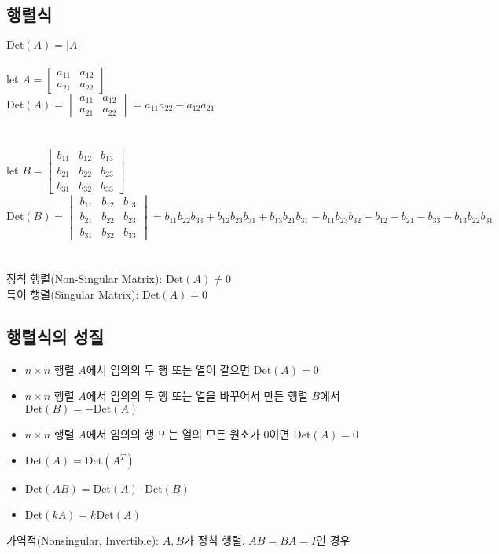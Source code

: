\subsection{행렬식}
$\mathrm{Det}(A) = |A|$\\\\
let $A = \begin{bmatrix}
    a_{11} & a_{12}\\
    a_{21} & a_{22}
\end{bmatrix}$\\
$\mathrm{Det}(A) = \begin{vmatrix}
    a_{11} & a_{12}\\
    a_{21} & a_{22}
\end{vmatrix} = a_{11}a_{22}-a_{12}a_{21}$\\\\\\
let $B = \begin{bmatrix}
    b_{11}&b_{12}&b_{13}\\
    b_{21}&b_{22}&b_{23}\\
    b_{31}&b_{32}&b_{33}
\end{bmatrix}$\\
$\mathrm{Det}(B) = \begin{vmatrix}
    b_{11}&b_{12}&b_{13}\\
    b_{21}&b_{22}&b_{23}\\
    b_{31}&b_{32}&b_{33}
\end{vmatrix} = b_{11}b_{22}b_{33}+b_{12}b_{23}b_{31}+b_{13}b_{21}b_{31}-b_{11}b_{23}b_{32}-b_{12}-b_{21}-b_{33}-b_{13}b_{22}b_{31}$\\\\\\
정칙 행렬(Non-Singular Matrix): $\mathrm{Det}(A) \neq 0$\\
특이 행렬(Singular Matrix): $\mathrm{Det}(A) = 0$\\
\subsection{행렬식의 성질}
\begin{itemize}
    \item $n \times n$ 행렬 $A$에서 임의의 두 행 또는 열이 같으면 $\mathrm{Det}(A) = 0$
    \item $n \times n$ 행렬 $A$에서 임의의 두 행 또는 열을 바꾸어서 만든 행렬 $B$에서 $\mathrm{Det}(B) = -\mathrm{Det}(A)$
    \item $n \times n$ 행렬 $A$에서 임의의 행 또는 열의 모든 원소가 $0$이면 $\mathrm{Det}(A) = 0$
    \item $\mathrm{Det}(A) = \mathrm{Det}(A^T)$
    \item $\mathrm{Det}(AB) = \mathrm{Det}(A) \cdot \mathrm{Det}(B)$
    \item $\mathrm{Det}(kA) = k\mathrm{Det}(A)$
\end{itemize}$$$$
가역적(Nonsingular, Invertible): $A, B$가 정칙 행렬. $AB=BA=I$인 경우
